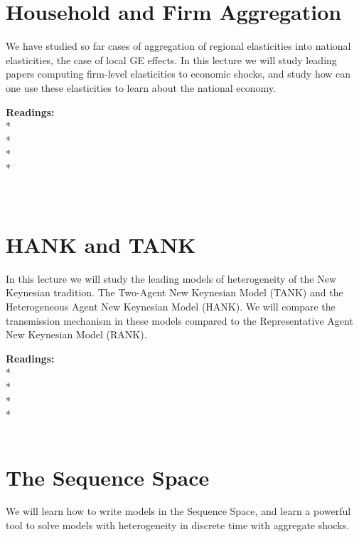 \documentclass [12pt]{article}
\begin{document}
\section{Household and Firm Aggregation}


We have studied so far cases of aggregation of regional elasticities into national elasticities, the case of local GE effects. In this lecture we will study leading papers computing firm-level elasticities to economic shocks, and study how can one use these elasticities to learn about the national economy.

\noindent\textbf{Readings:}\\
*\\
*\\
*\\
*\\
\\
\\



\section{HANK and TANK}

In this lecture we will study the leading models of heterogeneity of the New Keynesian tradition. The Two-Agent New Keynesian Model (TANK) and the Heterogeneous Agent New Keynesian Model (HANK). We will compare the transmission mechanism in these models compared to the Representative Agent New Keynesian Model (RANK).

\noindent\textbf{Readings:}\\
*\\
*\\
*\\
* \\
\\


\section{The Sequence Space}

We will learn how to write models in the Sequence Space, and learn a powerful tool to solve models with heterogeneity in discrete time with aggregate shocks.
\end{document}
